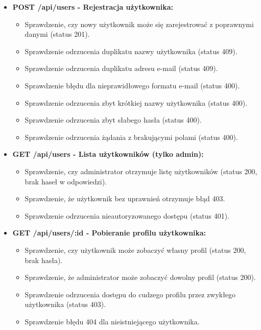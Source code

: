 \documentclass{article}
\begin{document}
\begin{itemize}
    \item \textbf{POST /api/users - Rejestracja użytkownika:}
    \begin{itemize}
        \item Sprawdzenie, czy nowy użytkownik może się zarejestrować z poprawnymi danymi (status 201).
        \item Sprawdzenie odrzucenia duplikatu nazwy użytkownika (status 409).
        \item Sprawdzenie odrzucenia duplikatu adresu e-mail (status 409).
        \item Sprawdzenie błędu dla nieprawidłowego formatu e-mail (status 400).
        \item Sprawdzenie odrzucenia zbyt krótkiej nazwy użytkownika (status 400).
        \item Sprawdzenie odrzucenia zbyt słabego hasła (status 400).
        \item Sprawdzenie odrzucenia żądania z brakującymi polami (status 400).
    \end{itemize}

    \item \textbf{GET /api/users - Lista użytkowników (tylko admin):}
    \begin{itemize}
        \item Sprawdzenie, czy administrator otrzymuje listę użytkowników (status 200, brak haseł w odpowiedzi).
        \item Sprawdzenie, że użytkownik bez uprawnień otrzymuje błąd 403.
        \item Sprawdzenie odrzucenia nieautoryzowanego dostępu (status 401).
    \end{itemize}

    \item \textbf{GET /api/users/:id - Pobieranie profilu użytkownika:}
    \begin{itemize}
        \item Sprawdzenie, czy użytkownik może zobaczyć własny profil (status 200, brak hasła).
        \item Sprawdzenie, że administrator może zobaczyć dowolny profil (status 200).
        \item Sprawdzenie odrzucenia dostępu do cudzego profilu przez zwykłego użytkownika (status 403).
        \item Sprawdzenie błędu 404 dla nieistniejącego użytkownika.
    \end{itemize}


\end{itemize}
\end{document}
